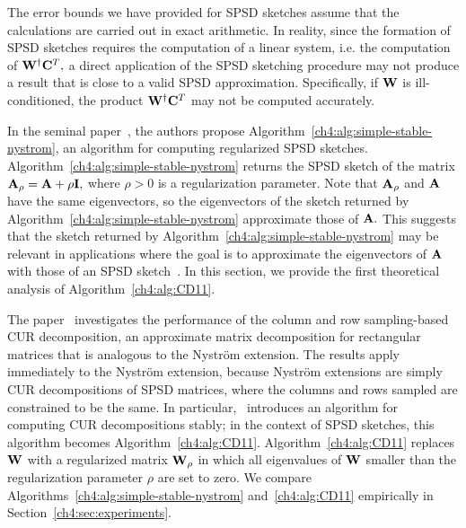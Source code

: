 The error bounds we have provided for SPSD sketches assume that
the calculations are carried out in exact arithmetic. In reality, since
the formation of SPSD sketches requires the computation of a linear
system, i.e. the computation of $\mathbf{W}^\dagger \mathbf{C}^T,$ 
a direct application of the SPSD sketching procedure may not 
produce a result that is close to a valid SPSD
approximation. Specifically, if $\mathbf{W}$ is ill-conditioned, the product
$\mathbf{W}^\dagger \mathbf{C}^T$ may not be computed accurately. 

In the seminal paper~\cite{WS01}, the authors propose Algorithm~\ref{ch4:alg:simple-stable-nystrom}, 
an algorithm for computing regularized
SPSD sketches. Algorithm~\ref{ch4:alg:simple-stable-nystrom} returns the SPSD sketch of the matrix
$\mathbf{A}_\rho = \mathbf{A} + \rho \mathbf{I},$ where $\rho > 0$ is a regularization parameter. 
Note that $\mathbf{A}_\rho$ and $\mathbf{A}$ have the same eigenvectors, so the eigenvectors of the
sketch returned by Algorithm~\ref{ch4:alg:simple-stable-nystrom} approximate those of
$\mathbf{A}.$ This suggests that the sketch returned by Algorithm~\ref{ch4:alg:simple-stable-nystrom} may be
relevant in applications where the goal is to approximate the eigenvectors of $\mathbf{A}$
with those of an SPSD sketch~\cite{BCFM04,FLNRS09,BF11}. In this section, we provide the first
theoretical analysis of Algorithm~\ref{ch4:alg:CD11}.

The paper~\cite{CD11}
investigates the performance of the column and row sampling-based CUR decomposition, an
approximate matrix decomposition for rectangular matrices that is analogous to
the Nystr\"om extension. The results apply immediately to the Nystr\"om extension, because
Nystr\"om extensions are simply CUR decompositions of SPSD matrices, where the
columns and rows sampled are constrained to be the same. In particular,~\cite{CD11}
introduces an algorithm for computing CUR decompositions stably; in the context of
SPSD sketches, this algorithm becomes Algorithm~\ref{ch4:alg:CD11}. Algorithm~\ref{ch4:alg:CD11}
replaces 
$\mathbf{W}$ with a regularized matrix $\mathbf{W}_\rho$ in which all eigenvalues of $\mathbf{W}$ smaller than the 
regularization parameter $\rho$ are set to zero. We compare Algorithms~\ref{ch4:alg:simple-stable-nystrom}
and~\ref{ch4:alg:CD11} empirically in Section~\ref{ch4:sec:experiments}.

